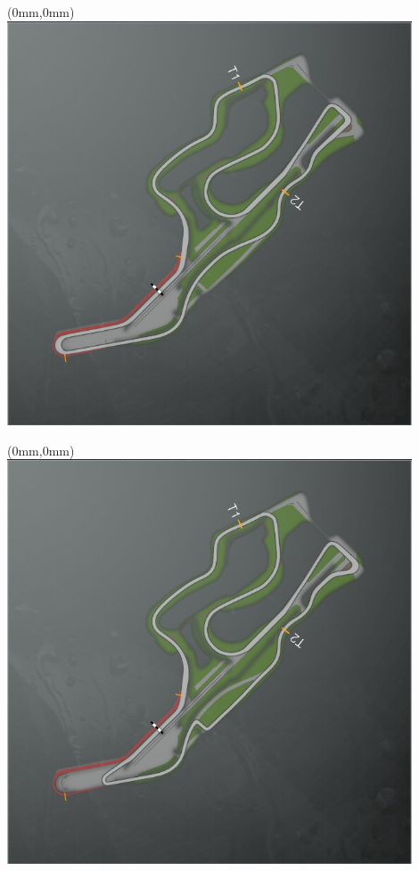 \null\newpage
\begin{textblock*}{30mm}(0mm,0mm)%
\includegraphics[width=120mm]{TR/2015-05-20_00065.png}
\end{textblock*}
\null\newpage
\begin{textblock*}{30mm}(0mm,0mm)%
\includegraphics[width=120mm]{TR/2015-05-20_00064.png}
\end{textblock*}

